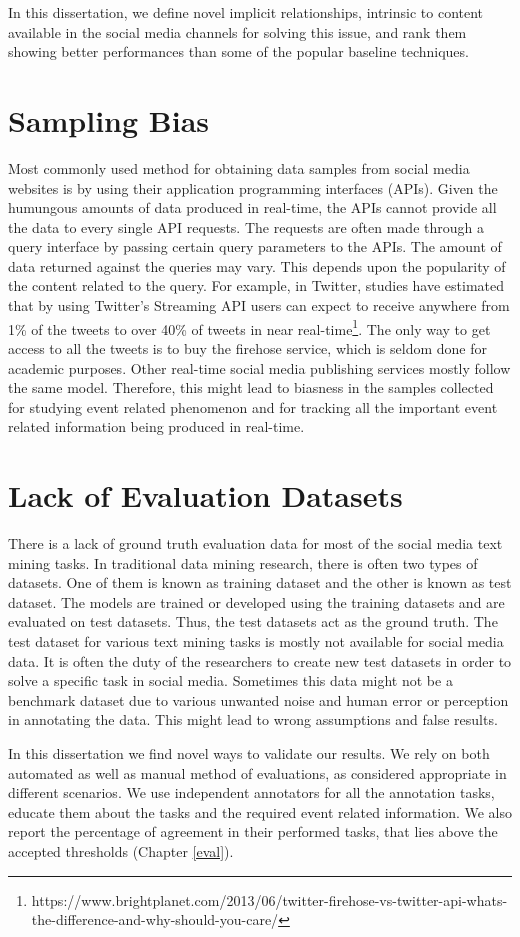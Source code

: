 In this dissertation, we define novel implicit relationships, intrinsic to content available in the social media channels for solving this issue, and rank them showing better performances than some of the popular baseline techniques.  


\section{Sampling Bias}
Most commonly used method for obtaining data samples from social media websites is by using their application programming interfaces (APIs). Given the humungous amounts of data produced in real-time, the APIs cannot provide all the data to every single API requests. The requests are often made through a query interface by passing certain query parameters to the APIs. The amount of data returned against the queries may vary. This depends upon the popularity of the content related to the query. For example, in Twitter, studies have estimated that by using Twitter's Streaming API users can expect to receive anywhere from 1\% of the tweets to over 40\% of tweets in near real-time\footnote{https://www.brightplanet.com/2013/06/twitter-firehose-vs-twitter-api-whats-the-difference-and-why-should-you-care/}. The only way to get access to all the tweets is to buy the firehose service, which is seldom done for academic purposes. Other real-time social media publishing services mostly follow the same model. Therefore, this might lead to biasness in the samples collected for studying event related phenomenon and for tracking all the important event related information being produced in real-time.


\section{Lack of Evaluation Datasets}
There is a lack of ground truth evaluation data for most of the social media text mining tasks. In traditional data mining research, there is often two types of datasets. One of them is known as training dataset and the other is known as test dataset. The models are trained or developed using the training datasets and are evaluated on test datasets. Thus, the test datasets act as the ground truth. The test dataset for various text mining tasks is mostly not available for social media data. It is often the duty of the researchers to create new test datasets in order to solve a specific task in social media. Sometimes this data might not be a benchmark dataset due to various unwanted noise and human error or perception in annotating the data. This might lead to wrong assumptions and false results.

In this dissertation we find novel ways to validate our results. We rely on both automated as well as manual method of evaluations, as considered appropriate in different scenarios. We use independent annotators for all the annotation tasks, educate them about the tasks and the required event related information. We also report the percentage of agreement in their performed tasks, that lies above the accepted thresholds (Chapter \ref{eval}).
